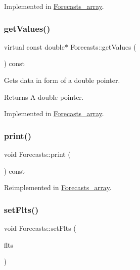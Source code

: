 Implemented in \mbox{\hyperlink{class_forecasts__array_ad37886d56310b642647c54d634e447a1}{Forecasts\+\_\+array}}.

\mbox{\label{class_forecasts_a329d00c8a677da77c514908182fda0b6}} 
\subsubsection{\texorpdfstring{get\+Values()}{getValues()}}
{\footnotesize\ttfamily virtual const double$\ast$ Forecasts\+::get\+Values (\begin{DoxyParamCaption}{ }\end{DoxyParamCaption}) const\hspace{0.3cm}{\ttfamily [pure virtual]}}

Gets data in form of a double pointer. \begin{DoxyReturn}{Returns}
A double pointer. 
\end{DoxyReturn}


Implemented in \mbox{\hyperlink{class_forecasts__array_a5b8a91680acc4969aeb968b4f4a35a73}{Forecasts\+\_\+array}}.

\mbox{\label{class_forecasts_addb1f75f0dc6833c466453c51256812c}} 
\subsubsection{\texorpdfstring{print()}{print()}}
{\footnotesize\ttfamily void Forecasts\+::print (\begin{DoxyParamCaption}\item[{std\+::ostream \&}]{ }\end{DoxyParamCaption}) const\hspace{0.3cm}{\ttfamily [virtual]}}



Reimplemented in \mbox{\hyperlink{class_forecasts__array_a56985347f516340034b29dc4cdda87b1}{Forecasts\+\_\+array}}.

\mbox{\label{class_forecasts_aa15a4e56c5747afc1594131ad30e4fc3}} 
\subsubsection{\texorpdfstring{set\+Flts()}{setFlts()}}
{\footnotesize\ttfamily void Forecasts\+::set\+Flts (\begin{DoxyParamCaption}\item[{\mbox{\hyperlink{classanen_time_1_1_f_l_ts}{anen\+Time\+::\+F\+L\+Ts}}}]{flts }\end{DoxyParamCaption})}

